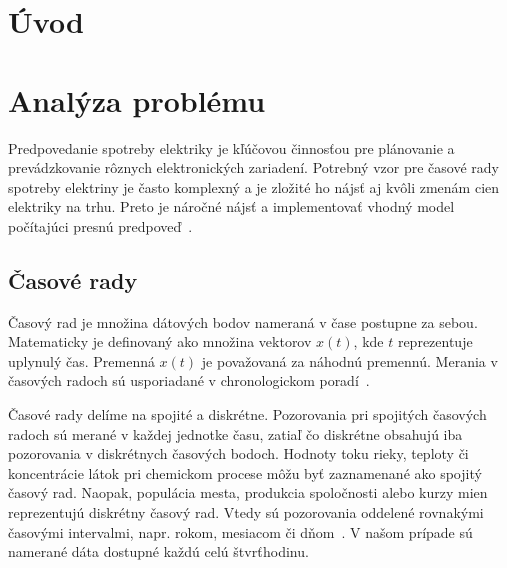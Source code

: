 \documentclass[a4paper,slovak,12pt,appendix]{article}
\begin{document}

\newpage
\tableofcontents


\newpage
\section{Úvod}


\newpage
\section{Analýza problému}
Predpovedanie spotreby elektriky je kľúčovou činnosťou pre plánovanie
a prevádzkovanie rôznych elektronických zariadení. Potrebný vzor pre časové
rady spotreby elektriny je často komplexný a je zložité ho nájsť aj kvôli
zmenám cien elektriky na trhu. Preto je náročné nájsť a implementovať vhodný
model počítajúci presnú predpoveď~\cite{Mahalakshmi2016}.


\subsection{Časové rady}
Časový rad je množina dátových bodov nameraná v čase postupne za sebou.
Matematicky je definovaný ako množina vektorov $x(t)$, kde $t$ reprezentuje
uplynulý čas. Premenná $x(t)$ je považovaná za náhodnú premennú.
Merania v časových radoch sú usporiadané v chronologickom
poradí~\cite{Agrawal2013}.

Časové rady delíme na spojité a diskrétne. Pozorovania pri spojitých časových
radoch sú merané v každej jednotke času, zatiaľ čo diskrétne obsahujú iba
pozorovania v diskrétnych časových bodoch. Hodnoty toku rieky, teploty
či koncentrácie látok pri chemickom procese môžu byť zaznamenané ako spojitý
časový rad. Naopak, populácia mesta, produkcia spoločnosti alebo kurzy mien
reprezentujú diskrétny časový rad. Vtedy sú pozorovania oddelené rovnakými
časovými intervalmi, napr. rokom, mesiacom či dňom~\cite{Agrawal2013}. V našom
prípade sú namerané dáta dostupné každú celú štvrťhodinu.
\end{document}
